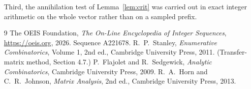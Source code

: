 \documentclass[11pt,a4paper]{article}
\theoremstyle{plain}
\theoremstyle{definition}
\begin{document}
Third, the annihilation test of Lemma~\ref{lem:crit} was carried out in exact integer
arithmetic on the whole vector rather than on a sampled prefix.

\begin{thebibliography}{9}
 The OEIS Foundation, \emph{The On-Line Encyclopedia of Integer
Sequences}, \url{https://oeis.org}, 2026. Sequence A221678.
 R.~P.~Stanley, \emph{Enumerative Combinatorics}, Volume 1, 2nd ed.,
Cambridge University Press, 2011. (Transfer-matrix method, Section 4.7.)
 P.~Flajolet and R.~Sedgewick, \emph{Analytic Combinatorics}, Cambridge
University Press, 2009.
 R.~A.~Horn and C.~R.~Johnson, \emph{Matrix Analysis}, 2nd ed., Cambridge
University Press, 2013.
\end{thebibliography}
\end{document}
